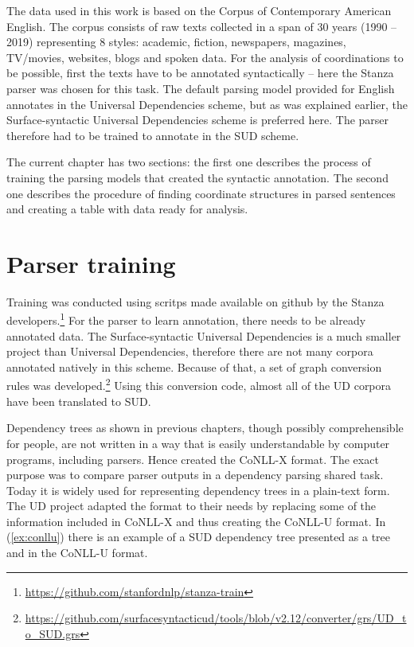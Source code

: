 The data used in this work is based on the Corpus of Contemporary American English. The corpus consists of raw texts collected in a span of 30 years (1990 -- 2019) representing 8 styles: academic, fiction, newspapers, magazines, TV/movies, websites, blogs and spoken data. For the analysis of coordinations to be possible, first the texts have to be annotated syntactically -- here the Stanza parser was chosen for this task. The default parsing model provided for English annotates in the Universal Dependencies scheme, but as was explained earlier, the Surface-syntactic Universal Dependencies scheme is preferred here. The parser therefore had to be trained to annotate in the SUD scheme. 

The current chapter has two sections: the first one describes the process of training the parsing models that created the syntactic annotation. The second one describes the procedure of finding coordinate structures in parsed sentences and creating a table with data ready for analysis. 

\section{Parser training}
Training was conducted using scritps made available on github by the Stanza developers.\footnote{\url{https://github.com/stanfordnlp/stanza-train}} For the parser to learn annotation, there needs to be already annotated data. The Surface-syntactic Universal Dependencies is a much smaller project than Universal Dependencies, therefore there are not many corpora annotated natively in this scheme. Because of that, a set of graph conversion rules was developed.\footnote{\url{https://github.com/surfacesyntacticud/tools/blob/v2.12/converter/grs/UD_to_SUD.grs}} Using this conversion code, almost all of the UD corpora have been translated to SUD. 

Dependency trees as shown in previous chapters, though possibly comprehensible for people, are not written in a way that is easily understandable by computer programs, including parsers. Hence \cite{buchholz-marsi-2006-conll} created the CoNLL-X format. The exact purpose was to compare parser outputs in a dependency parsing shared task. Today it is widely used for representing dependency trees in a plain-text form. The UD project adapted the format to their needs by replacing some of the information included in CoNLL-X and thus creating the CoNLL-U format. In (\ref{ex:conllu}) there is an example of a SUD dependency tree presented as a tree and in the CoNLL-U format. 

